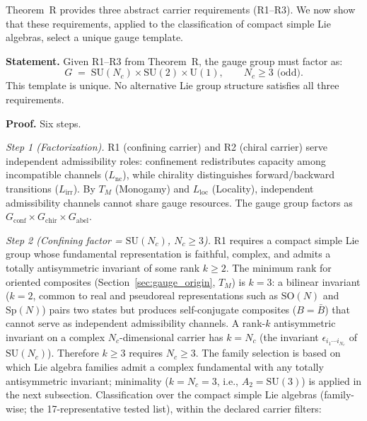 \documentclass[11pt]{article}
\newcommand{\SU}{\mathrm{SU}}
\newcommand{\U}{\mathrm{U}}
\begin{document}
Theorem~R provides three abstract carrier requirements (R1--R3).  We now show that these requirements, applied to the classification of compact simple Lie algebras, select a unique gauge template.

\begin{tcolorbox}[apfbox, title={Lemma $L_{\mathrm{gauge,unique}}$ (Gauge Template Uniqueness)}]
\textbf{Statement.}  Given R1--R3 from Theorem~R, the gauge group must factor as:
\begin{equation}
G \;=\; \SU(N_c) \times \SU(2) \times \U(1), \qquad N_c \ge 3 \text{ (odd)}.
\label{eq:gauge_template}
\end{equation}
This template is unique.  No alternative Lie group structure satisfies all three requirements.

\smallskip\noindent\textbf{Proof.}  Six steps.

\medskip\noindent\textit{Step 1 (Factorization).}  R1 (confining carrier) and R2 (chiral carrier) serve independent admissibility roles: confinement redistributes capacity among incompatible channels ($L_{\mathrm{nc}}$), while chirality distinguishes forward/backward transitions ($L_{\mathrm{irr}}$).  By $T_M$ (Monogamy) and $L_{\mathrm{loc}}$ (Locality), independent admissibility channels cannot share gauge resources.  The gauge group factors as $G_{\mathrm{conf}} \times G_{\mathrm{chir}} \times G_{\mathrm{abel}}$.

\medskip\noindent\textit{Step 2 (Confining factor = $\SU(N_c)$, $N_c \ge 3$).}  R1 requires a compact simple Lie group whose fundamental representation is faithful, complex, and admits a totally antisymmetric invariant of some rank $k \ge 2$.  The minimum rank for oriented composites (Section~\ref{sec:gauge_origin}, $T_M$) is $k = 3$: a bilinear invariant ($k=2$, common to real and pseudoreal representations such as $\mathrm{SO}(N)$ and $\mathrm{Sp}(N)$) pairs two states but produces self-conjugate composites ($B = \bar{B}$) that cannot serve as independent admissibility channels.  A rank-$k$ antisymmetric invariant on a complex $N_c$-dimensional carrier has $k = N_c$ (the invariant $\epsilon_{i_1 \cdots i_{N_c}}$ of $\SU(N_c)$).  Therefore $k \ge 3$ requires $N_c \ge 3$.  The family selection is based on which Lie algebra families admit a complex fundamental with any totally antisymmetric invariant; minimality ($k = N_c = 3$, i.e., $A_2 = \SU(3)$) is applied in the next subsection.  Classification over the compact simple Lie algebras (family-wise; the 17-representative tested list), within the declared carrier filters:


\end{tcolorbox}
\end{document}
